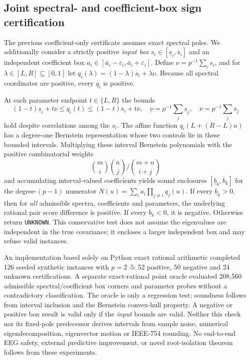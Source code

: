 \subsection{Joint spectral- and coefficient-box sign certification}
\label{sec:p4-joint-box}
The previous coefficient-only certificate assumes exact spectral poles.
We additionally consider a strictly positive \emph{input box}
$s_i\in[\underline s_i,\overline s_i]$ and an independent
coefficient box $a_i\in[\bar a_i-\varepsilon_i,\bar a_i+\varepsilon_i]$.
Define $\nu=p^{-1}\sum_i s_i$, and for
$\lambda\in[L,R]\subseteq[0,1]$ let
$q_i(\lambda)=(1-\lambda)s_i+\lambda\nu$.
Because all spectral coordinates are positive, every $q_i$ is positive.

At each parameter endpoint $t\in\{L,R\}$ the bounds
\[
(1-t)\underline s_i+t\underline\nu
\leq q_i(t)\leq
(1-t)\overline s_i+t\overline\nu,\quad
\underline\nu=p^{-1}\sum_j\underline s_j,\quad
\overline\nu=p^{-1}\sum_j\overline s_j
\]
hold despite correlations among the $s_i$.
The affine function $q_i(L+(R-L)u)$ has a degree-one Bernstein
representation whose two controls lie in these bounded intervals.
Multiplying these interval Bernstein polynomials with the
positive combinatorial weights
\[
{m\choose i}{n\choose j}/{m+n\choose i+j}
\]
and accumulating interval-valued coefficients yields sound
enclosures $[\underline b_k,\overline b_k]$ for the degree-$(p-1)$
numerator $N(u)=\sum_i a_i\prod_{j\neq i}q_j(u)$.
If every $\underline b_k>0$, then for \emph{all} admissible
spectra, coefficients and parameters, the underlying rational
pair score difference is positive. If every
$\overline b_k<0$, it is negative. Otherwise return
\texttt{UNKNOWN}. This conservative test does not assume the
eigenvalues are independent in the true covariance; it encloses
a larger independent box and may refuse valid instances.

An implementation based solely on Python exact rational
arithmetic completed 126 seeded synthetic instances with
$p=2$--$5$: 52 positive, 50 negative and 24 unknown
certifications. A separate exact-rational point oracle evaluated
208,560 admissible spectral/coefficient box corners and parameter
probes without a contradictory classification. The oracle is
only a regression test; soundness follows from interval
inclusion and the Bernstein convex-hull property. A negative
or positive box result is valid only if the \emph{input}
bounds are valid. Neither this check nor its fixed-pole
predecessor derives intervals from sample noise, numerical
eigendecomposition, eigenvector motion or IEEE-754 rounding.
No end-to-end EEG safety, external predictive improvement,
or novel root-isolation theorem follows from these experiments.
